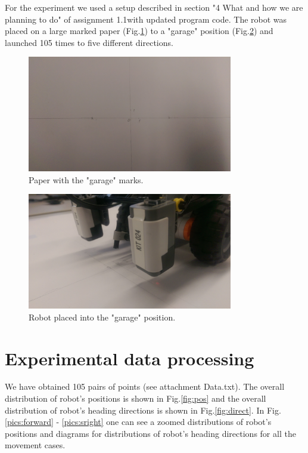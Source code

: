 \documentclass[a4paper, 12pt]{article}
\begin{document}
For the experiment we used a setup described in section "4 What and how we are planning to do" of assignment 1.1with updated program code. The robot was placed on a large marked paper (Fig.\ref{fig:paper}) to a "garage" position (Fig.\ref{fig:garage}) and launched 105 times to five different directions.

\begin{figure}[h]
  \centering
  \caption{Paper with the "garage" marks.\label{fig:paper}}
  \includegraphics[width=0.8\textwidth]{markedPaper}
\end{figure}

\begin{figure}[h]
  \centering
  \caption{Robot placed into the "garage" position.\label{fig:garage}}
  \includegraphics[width=0.8\textwidth]{garage}
\end{figure}


\section{Experimental data processing}

We have obtained 105 pairs of points (see attachment Data.txt). The overall distribution of robot's positions is shown in Fig.\ref{fig:pos} and the overall distribution of robot's heading directions is shown in Fig.\ref{fig:direct}. In Fig. \ref{pics:forward} - \ref{pics:sright} one can see a zoomed distributions of robot's positions and diagrams for distributions of robot's heading directions for all the movement cases.
\end{document}
